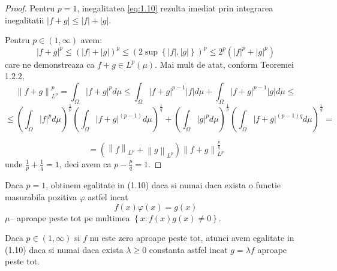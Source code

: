 \documentclass[a4paper,12pt,oneside]{report}
\begin{document}
\begin{proof}
Pentru \(p  = 1\), inegalitatea \ref{eq:1.10} rezulta imediat prin integrarea inegalitatii \(\left | f + g \right |\leq \left | f \right | + \left | g \right |\).

Pentru \(p \in \left ( 1 , \infty  \right )\) avem:
\begin{displaymath}
  \left | f + g  \right |^{p}\leq \left ( \left | f \right | +\left | g \right |\right )^{p}\leq \left ( 2 \sup\left \{ \left | f \right |,\left | g \right | \right \} \right )^{p}\leq 2^{p}\left ( \left | f \right |^{p}  + \left | g \right |^{p}\right )
\end{displaymath}
care ne demonstreaza ca \(f + g \in L^{p}\left ( \mu  \right )\). Mai mult de atat, conform Teoremei 1.2.2,
\begin{displaymath}
  \left \| f + g  \right \|_{L^{p}}^{p} = \int_{\Omega }\left | f + g \right |^{p}d\mu \leq \int_{\Omega }\left | f + g \right |^{p - 1}\left | f \right |d\mu + \int_{\Omega }\left | f + g  \right |^{p - 1}\left | g \right |d\mu \leq
\end{displaymath}
\begin{displaymath}
  \leq\left ( \int_{\Omega }\left | f \right |^{p}d\mu  \right )^{\frac{1}{p}}\left ( \int_{\Omega }\left | f + g  \right | ^{\left ( p - 1 \right )}d\mu \right )^{\frac{1}{q}}+ \left ( \int_{\Omega }\left | g \right |^{p}d\mu  \right )^{\frac{1}{p}}\left ( \int_{\Omega} \left | f + g \right |^{\left ( p - 1 \right )q}d\mu \right )^{\frac{1}{q}}=
\end{displaymath}

\begin{displaymath}
  =\left ( \left \| f \right \|_{L^{p}} + \left \| g \right \|_{L^{p}} \right )\left \| f + g  \right \|_{L^{p}}^{\frac{p}{q}}
\end{displaymath}
unde \(\frac{1}{p} + \frac{1}{q} = 1\), deci avem ca \(p - \frac{p}{q} = 1\). 	
\end{proof}



Daca \(p = 1\), obtinem egalitate in (1.10) daca si numai daca exista o functie masurabila pozitiva \(\varphi\) astfel incat
\begin{displaymath}
  f\left ( x \right )\varphi \left ( x \right ) = g\left ( x \right )
\end{displaymath}
\(\mu –\) aproape peste tot pe multimea \(\left \{ x : f\left ( x \right )g\left ( x \right )\neq 0 \right \}\).

	Daca \(p \in \left ( 1 , \infty  \right )\) si \(f\) nu este zero aproape peste tot, atunci avem egalitate in (1.10) daca si numai daca exista  \(\lambda \geq 0\) constanta astfel incat \(g = \lambda f\) aproape peste tot.
\end{document}
